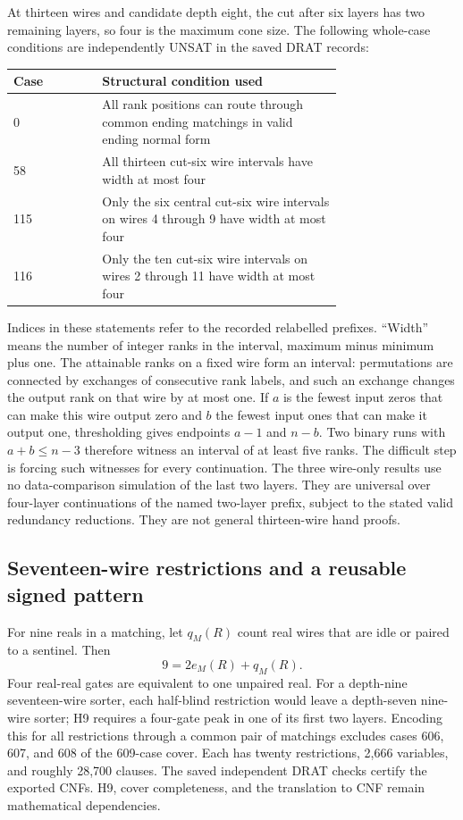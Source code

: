 \documentclass[11pt]{article}
\begin{document}
At thirteen wires and candidate depth eight, the cut after six layers has two remaining layers, so four is the maximum cone size. The following whole-case conditions are independently UNSAT in the saved DRAT records:
\begin{center}\small
\begin{tabular}{@{}lp{0.73\linewidth}@{}}\toprule
Case & Structural condition used\\\midrule
0 & All rank positions can route through common ending matchings in valid ending normal form\\
58 & All thirteen cut-six wire intervals have width at most four\\
115 & Only the six central cut-six wire intervals on wires 4 through 9 have width at most four\\
116 & Only the ten cut-six wire intervals on wires 2 through 11 have width at most four\\\bottomrule
\end{tabular}
\end{center}
Indices in these statements refer to the recorded relabelled prefixes. ``Width'' means the number of integer ranks in the interval, maximum minus minimum plus one. The attainable ranks on a fixed wire form an interval: permutations are connected by exchanges of consecutive rank labels, and such an exchange changes the output rank on that wire by at most one. If $a$ is the fewest input zeros that can make this wire output zero and $b$ the fewest input ones that can make it output one, thresholding gives endpoints $a-1$ and $n-b$. Two binary runs with $a+b\le n-3$ therefore witness an interval of at least five ranks. The difficult step is forcing such witnesses for every continuation. The three wire-only results use no data-comparison simulation of the last two layers. They are universal over four-layer continuations of the named two-layer prefix, subject to the stated valid redundancy reductions. They are not general thirteen-wire hand proofs.

\subsection{Seventeen-wire restrictions and a reusable signed pattern}
For nine reals in a matching, let $q_M(R)$ count real wires that are idle or paired to a sentinel. Then
\[
9=2e_M(R)+q_M(R).
\]
Four real-real gates are equivalent to one unpaired real. For a depth-nine seventeen-wire sorter, each half-blind restriction would leave a depth-seven nine-wire sorter; H9 requires a four-gate peak in one of its first two layers. Encoding this for all restrictions through a common pair of matchings excludes cases 606, 607, and 608 of the 609-case cover. Each has twenty restrictions, 2,666 variables, and roughly 28,700 clauses. The saved independent DRAT checks certify the exported CNFs. H9, cover completeness, and the translation to CNF remain mathematical dependencies.
\end{document}
